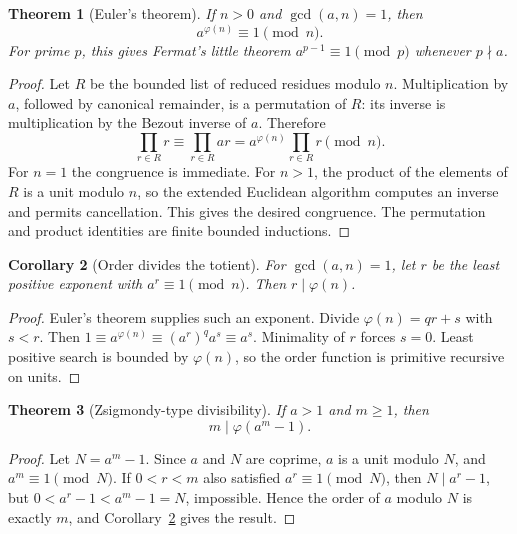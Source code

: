 \documentclass[11pt]{article}
\newtheorem{theorem}{Theorem}[section]
\newtheorem{corollary}[theorem]{Corollary}
\theoremstyle{definition}
\begin{document}
\begin{theorem}[Euler's theorem]\label{thm:euler}
If \(n>0\) and \(\gcd(a,n)=1\), then
\[
 \boxed{a^{\varphi(n)}\equiv1\pmod n.}
\]
For prime \(p\), this gives Fermat's little theorem
\(a^{p-1}\equiv1\pmod p\) whenever \(p\nmid a\).
\end{theorem}

\begin{proof}
Let \(R\) be the bounded list of reduced residues modulo \(n\).  Multiplication
by \(a\), followed by canonical remainder, is a permutation of \(R\): its
inverse is multiplication by the Bezout inverse of \(a\).  Therefore
\[
 \prod_{r\in R}r\equiv\prod_{r\in R}ar
 =a^{\varphi(n)}\prod_{r\in R}r\pmod n.
\]
For \(n=1\) the congruence is immediate.  For \(n>1\), the product of the elements of \(R\) is a unit modulo \(n\), so the extended
Euclidean algorithm computes an inverse and permits cancellation.  This gives
the desired congruence.  The permutation and product identities are finite
bounded inductions.
\end{proof}

\begin{corollary}[Order divides the totient]\label{cor:order-divides}
For \(\gcd(a,n)=1\), let \(r\) be the least positive exponent with
\(a^r\equiv1\pmod n\).  Then \(r\mid\varphi(n)\).
\end{corollary}

\begin{proof}
Euler's theorem supplies such an exponent.  Divide
\(\varphi(n)=qr+s\) with \(s<r\).  Then
\(1\equiv a^{\varphi(n)}\equiv(a^r)^q a^s\equiv a^s\).  Minimality of
\(r\) forces \(s=0\).  Least positive search is bounded by \(\varphi(n)\),
so the order function is primitive recursive on units.
\end{proof}

\begin{theorem}[Zsigmondy-type divisibility]\label{thm:order-am1}
If \(a>1\) and \(m\ge1\), then
\[
 \boxed{m\mid\varphi(a^m-1).}
\]
\end{theorem}

\begin{proof}
Let \(N=a^m-1\).  Since \(a\) and \(N\) are coprime,
\(a\) is a unit modulo \(N\), and \(a^m\equiv1\pmod N\).  If
\(0<r<m\) also satisfied \(a^r\equiv1\pmod N\), then
\(N\mid a^r-1\), but
\(0<a^r-1<a^m-1=N\), impossible.  Hence the order of \(a\) modulo \(N\) is
exactly \(m\), and Corollary~\ref{cor:order-divides} gives the result.
\end{proof}
\end{document}
